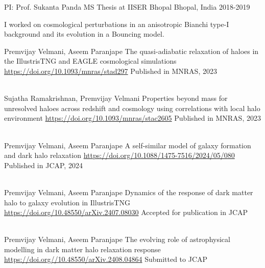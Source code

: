 \begin{cventries}

{
\cventry
{PI: Prof. Sukanta Panda} %
{MS Thesis at IISER Bhopal} %
{Bhopal, India} %
{2018-2019} %
{ %
\begin{cvitems}
\item {I worked on cosmological perturbations in an anisotropic Bianchi type-I background and its evolution in a Bouncing model.}
\end{cvitems}
}
}

\end{cventries}



\begin{cventries}

{
\cventry
{Premvijay Velmani, Aseem Paranjape}
{The quasi-adiabatic relaxation of haloes in the IllustrisTNG and EAGLE cosmological simulations}
{\url{https://doi.org/10.1093/mnras/stad297}}
{Published in MNRAS, 2023}
{
}
}

~\\[-8mm]
{
\cventry
{Sujatha Ramakrishnan, Premvijay Velmani}
{Properties beyond mass for unresolved haloes across redshift and cosmology using correlations with local halo environment}
{\url{https://doi.org/10.1093/mnras/stac2605}}
{Published in MNRAS, 2023}
{
}
}

~\\[-8mm]
{
\cventry
{Premvijay Velmani, Aseem Paranjape}
{A self-similar model of galaxy formation and dark halo relaxation}
{\url{https://doi.org/10.1088/1475-7516/2024/05/080}}
{Published in JCAP, 2024}
{
}
}

~\\[-8mm]
{
\cventry
{Premvijay Velmani, Aseem Paranjape}
{Dynamics of the response of dark matter halo to galaxy evolution in IllustrisTNG}
{\url{https://doi.org/10.48550/arXiv.2407.08030}}
{Accepted for publication in JCAP}
{
}
}

~\\[-8mm]
{
\cventry
{Premvijay Velmani, Aseem Paranjape}
{The evolving role of astrophysical modelling in dark matter halo relaxation response}
{\url{https://doi.org//10.48550/arXiv.2408.04864}}
{Submitted to JCAP}
{
}
}

\end{cventries}


